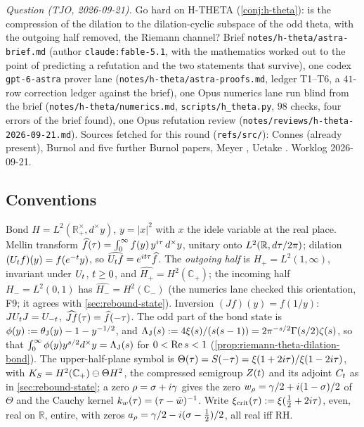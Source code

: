 \emph{Question (TJO, 2026-09-21).} Go hard on H-THETA (\cref{conj:h-theta}): is the compression of the dilation to the
dilation-cyclic subspace of the odd theta, with the outgoing half removed, the Riemann channel? Brief
\texttt{notes/h-theta/astra-brief.md} (author \texttt{claude:fable-5.1}, with the mathematics worked out to the point
of predicting a refutation and the two statements that survive), one codex \texttt{gpt-6-astra} prover lane
(\texttt{notes/h-theta/astra-proofs.md}, ledger T1--T6, a $41$-row correction ledger against the brief), one Opus
numerics lane run blind from the brief (\texttt{notes/h-theta/numerics.md}, \texttt{scripts/h\_theta.py}, $98$
checks, four errors of the brief found), one Opus refutation review (\texttt{notes/reviews/h-theta-2026-09-21.md}).
Sources fetched for this round (\texttt{refs/src/}): Connes \cite{connes1998trace} (already present), Burnol
\cite{burnol2001causality,burnol2004systems} and five further Burnol papers, Meyer \cite{meyer2005idele}, Uetake
\cite{uetake2007lax}. Worklog 2026-09-21.

\subsection{Conventions}

Bond $H = L^2(\mathbb R_+^\times, d^\times y)$, $y = |x|^2$ with $x$ the idele variable at the real place. Mellin
transform $\widehat f(\tau) = \int_0^\infty f(y)\,y^{i\tau}\,d^\times y$, unitary onto $L^2(\mathbb R, d\tau/2\pi)$;
dilation $(U_t f)(y) = f(e^{-t}y)$, so $\widehat{U_t f} = e^{it\tau}\widehat f$. The \emph{outgoing half} is
$H_+ = L^2(1,\infty)$, invariant under $U_t$, $t\ge0$, and $\widehat{H_+} = H^2(\mathbb C_+)$; the incoming half
$H_- = L^2(0,1)$ has $\widehat{H_-} = H^2(\mathbb C_-)$ (the numerics lane checked this orientation, F9; it agrees
with \cref{sec:rebound-state}). Inversion $(Jf)(y) = f(1/y)$: $JU_t J = U_{-t}$, $\widehat{Jf}(\tau) =
\widehat f(-\tau)$. The odd part of the bond state is $\phi(y) := \theta_{\mathrm J}(y) - 1 - y^{-1/2}$, and
$\Lambda_{\mathrm J}(s) := 4\xi(s)/(s(s-1)) = 2\pi^{-s/2}\Gamma(s/2)\zeta(s)$, so that $\int_0^\infty\phi(y)y^{s/2}d^\times y =
\Lambda_{\mathrm J}(s)$ for $0<\operatorname{Re} s<1$ (\cref{prop:riemann-theta-dilation-bond}). The upper-half-plane symbol is
$\Theta(\tau) = S(-\tau) = \xi(1+2i\tau)/\xi(1-2i\tau)$, with $K_S = H^2(\mathbb C_+)\ominus\Theta H^2$, the
compressed semigroup $Z(t)$ and its adjoint $C_t$ as in \cref{sec:rebound-state}; a zero $\rho = \sigma+i\gamma$
gives the zero $w_\rho = \gamma/2 + i(1-\sigma)/2$ of $\Theta$ and the Cauchy kernel $k_w(\tau) = (\tau-\bar w)^{-1}$.
Write $\xi_{\mathrm{crit}}(\tau) := \xi(\tfrac12 + 2i\tau)$, even, real on $\mathbb R$, entire, with zeros
$a_\rho = \gamma/2 - i(\sigma-\tfrac12)/2$, all real iff RH.

